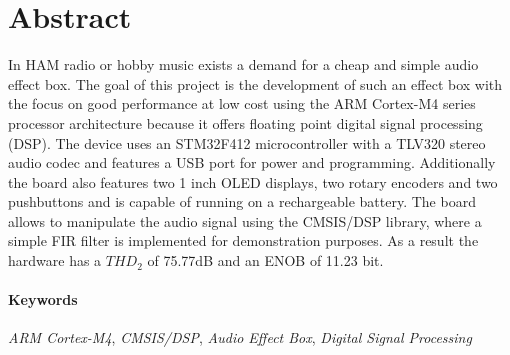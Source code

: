 \section*{Abstract}
\label{sec:Abstract}

In HAM radio or hobby music exists a demand for a cheap and simple audio effect box.
The goal of this project is the development of such an effect box with the focus on good performance at low cost using the ARM Cortex-M4 series processor architecture because it offers floating point digital signal processing (DSP).
The device uses an STM32F412 microcontroller with a TLV320 stereo audio codec and features a USB port for power and programming. Additionally the board also features two 1 inch OLED displays, two rotary encoders and two pushbuttons and is capable of running on a rechargeable battery.
The board allows to manipulate the audio signal using the CMSIS/DSP library, where a simple FIR filter is implemented for demonstration purposes.
As a result the hardware has a $THD_2$ of 75.77dB and an ENOB of 11.23 bit.


\paragraph{Keywords}

\textit{ARM Cortex-M4}, \textit{CMSIS/DSP}, \textit{Audio Effect Box}, \textit{Digital Signal Processing}


